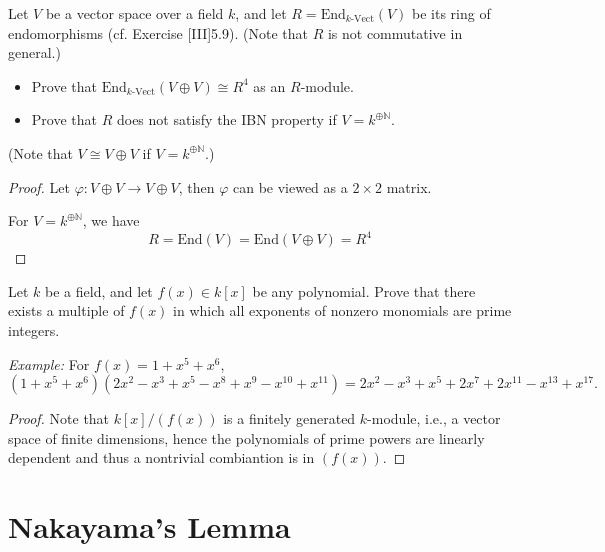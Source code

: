 \documentclass[openany]{book}
\begin{document}
\begin{prob}[1.12]
    Let \( V \) be a vector space over a field \( k \), and let \( R = \text{End}_{k\text{-Vect}}(V) \) be its ring of endomorphisms (cf. Exercise [III]5.9). (Note that \( R \) is not commutative in general.)
\begin{itemize}
    \item Prove that \(\text{End}_{k\text{-Vect}}(V \oplus V) \cong R^4\) as an \( R \)-module.
    \item Prove that \( R \) does not satisfy the IBN property if \( V = k^{\oplus \mathbb{N}} \).
\end{itemize}
(Note that \( V \cong V \oplus V \) if \( V = k^{\oplus \mathbb{N}} \).)
\end{prob}
\begin{proof}
    Let $\varphi:V\oplus V\to V\oplus V$, then $\varphi$ can be viewed as a $2\times 2$ matrix. 

    For $V=k^{\oplus\mathbb{N}}$, we have 
    \begin{equation*}
        R=\text{End}(V)=\text{End}(V\oplus V)=R^4
    \end{equation*}


\end{proof}

\begin{prob}[1.19]
    Let \( k \) be a field, and let \( f(x) \in k[x] \) be any polynomial. Prove that there exists a multiple of \( f(x) \) in which all exponents of nonzero monomials are prime integers. 

\textit{Example:} For \( f(x) = 1 + x^5 + x^6 \),
\[
(1 + x^5 + x^6)(2x^2 - x^3 + x^5 - x^8 + x^9 - x^{10} + x^{11}) = 2x^2 - x^3 + x^5 + 2x^7 + 2x^{11} - x^{13} + x^{17}.
\]
\end{prob}
\begin{proof}
    Note that $k[x]/(f(x))$ is a finitely generated $k$-module, i.e., a vector space of finite dimensions, hence the polynomials of prime powers are linearly dependent and thus a nontrivial combiantion is in $(f(x))$.
\end{proof}





\section{Nakayama's Lemma}
\end{document}
